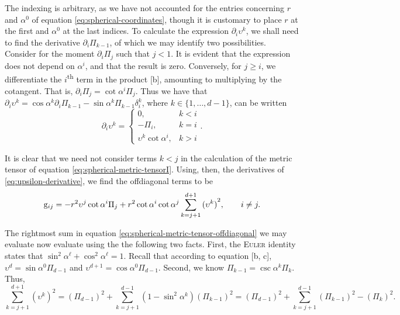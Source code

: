 \noindent
The indexing is arbitrary, as we have not accounted for the entries concerning $r$ and $\alpha^{0}$ of equation \eqref{eq:spherical-coordinates}, though it is customary to place $r$ at the first and $\alpha^0$ at the last indices.
To calculate the expression $\partial_i \upsilon^k$, we shall need to find the derivative $\partial_i \Pi_{k-1}$, of which we may identify two possibilities.
Consider for the moment $\partial_i \Pi_j$ such that $j < 1$.
It is evident that the expression does not depend on $\alpha^i$, and that the result is zero.
Conversely, for $j \geq i$, we differentiate the $i$\textsuperscript{th} term in the product \subeqref{\ref{eq:spherical-coordinates-product}}[b], amounting to multiplying by the cotangent.
That is, $\partial_i \Pi_j = \cot{\alpha^i} \Pi_j$.
Thus we have that $\partial_i \upsilon^k = \cos{\alpha^k} \partial_i\Pi_{k-1} - \sin{\alpha^k} \Pi_{k-1} \delta_{i}^{k}$, where $k \in \{ 1, \dots, d-1 \}$, can be written
%
\begin{equation}\label{eq:upsilon-derivative}
  \partial_i \upsilon^k = \begin{cases}
    0, & k < i\\
    -\Pi_i, & k = i\\
    \upsilon^k \cot{\alpha^i}, & k > i
  \end{cases}.
\end{equation}

\noindent
It is clear that we need not consider terms $k < j$ in the calculation of the metric tensor of equation \eqref{eq:spherical-metric-tensorI}.
Using, then, the derivatives of \eqref{eq:upsilon-derivative}, we find the offdiagonal terms to be
%
\begin{equation}\label{eq:spherical-metric-tensor-offdiagonal}
  \mathrm{g}_{ij} = -r^2 \upsilon^j \cot{\alpha^i} \Pi_j + r^2 \cot{\alpha^i} \cot{\alpha^j} \sum_{k = j+1}^{d+1} {(\upsilon^k)}^2, \qquad i \neq j.
\end{equation}

\noindent
The rightmost sum in equation \eqref{eq:spherical-metric-tensor-offdiagonal} we may evaluate now evaluate using the the following two facts.
First, the \textsc{Euler} identity states that $\sin^2{\alpha^\ell} + \cos^2{\alpha^\ell} = 1$.
Recall that according to equation \subeqref{\ref{eq:spherical-coordinates}}[b, c], $\upsilon^{d} = \sin{\alpha^0}\Pi_{d-1}$ and $\upsilon^{d+1} = \cos{\alpha^0}\Pi_{d-1}$.
Second, we know $\Pi_{k-1} = \csc{\alpha^k}\Pi_{k}$.
Thus,
%
\[
  \sum_{k = j+1}^{d+1} {(\upsilon^k)}^2 = {(\Pi_{d-1})}^2 + \sum_{k = j+1}^{d-1} (1-\sin^2{\alpha^k}) {(\Pi_{k-1})}^2 = {(\Pi_{d-1})}^2 + \sum_{k = j+1}^{d-1} {(\Pi_{k-1})}^2 - {(\Pi_{k})}^2.
\]

